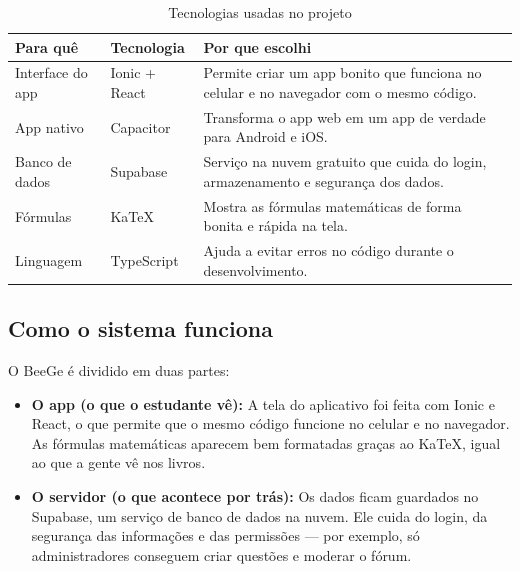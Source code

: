 \documentclass[12pt, a4paper]{article}
\begin{document}
\begin{table}[H]
\centering
\caption{Tecnologias usadas no projeto}
\begin{tabularx}{\textwidth}{l l X}
\toprule
\textbf{Para qu\^{e}} & \textbf{Tecnologia} & \textbf{Por que escolhi} \\
\midrule
Interface do app & Ionic + React & Permite criar um app bonito que funciona no celular e no navegador com o mesmo c\'{o}digo. \\
App nativo & Capacitor & Transforma o app web em um app de verdade para Android e iOS. \\
Banco de dados & Supabase & Servi\c{c}o na nuvem gratuito que cuida do login, armazenamento e seguran\c{c}a dos dados. \\
F\'{o}rmulas & KaTeX & Mostra as f\'{o}rmulas matem\'{a}ticas de forma bonita e r\'{a}pida na tela. \\
Linguagem & TypeScript & Ajuda a evitar erros no c\'{o}digo durante o desenvolvimento. \\
\bottomrule
\end{tabularx}
\end{table}

\subsection{Como o sistema funciona}

O BeeGe \'{e} dividido em duas partes:

\begin{itemize}[leftmargin=2cm]
  \item \textbf{O app (o que o estudante v\^{e}):} A tela do aplicativo foi feita com Ionic e React, o que permite que o mesmo c\'{o}digo funcione no celular e no navegador. As f\'{o}rmulas matem\'{a}ticas aparecem bem formatadas gra\c{c}as ao KaTeX, igual ao que a gente v\^{e} nos livros.
  \item \textbf{O servidor (o que acontece por tr\'{a}s):} Os dados ficam guardados no Supabase, um servi\c{c}o de banco de dados na nuvem. Ele cuida do login, da seguran\c{c}a das informa\c{c}\~{o}es e das permiss\~{o}es --- por exemplo, s\'{o} administradores conseguem criar quest\~{o}es e moderar o f\'{o}rum.
\end{itemize}
\end{document}
